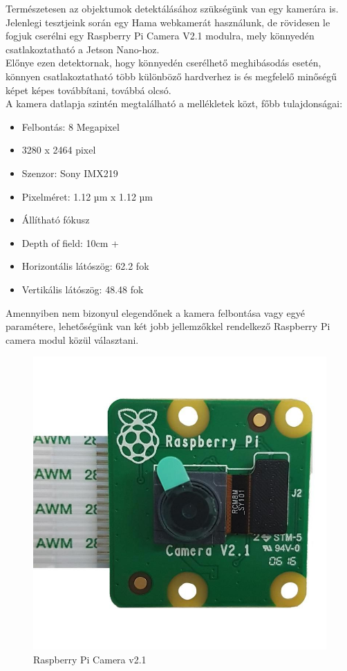 \documentclass{article}
\begin{document}
Természetesen az objektumok detektálásához szükségünk van egy kamerára is.\\
Jelenlegi tesztjeink során egy Hama webkamerát használunk, de rövidesen le fogjuk cserélni
egy Raspberry Pi Camera V2.1 modulra, mely könnyedén csatlakoztatható a Jetson Nano-hoz.\\
Előnye ezen detektornak, hogy könnyedén cserélhető meghibásodás esetén, könnyen csatlakoztatható több
különböző hardverhez is és megfelelő minőségű képet képes továbbítani, továbbá olcsó. \vspace{5pt}\\
A kamera datlapja szintén megtalálható a mellékletek közt, főbb tulajdonságai:
\begin{itemize}
    \item Felbontás: 8 Megapixel
    \item 3280 x 2464 pixel
    \item Szenzor: Sony IMX219
    \item Pixelméret: 1.12 µm x 1.12 µm
    \item Állítható fókusz
    \item Depth of field: 10cm +
    \item Horizontális látószög: 62.2 fok
    \item Vertikális látószög: 48.48 fok
\end{itemize}
Amennyiben nem bizonyul elegendőnek a kamera felbontása vagy egyé paramétere, lehetőségünk van 
két jobb jellemzőkkel rendelkező Raspberry Pi camera modul közül választani.
\begin{figure}
    \centering
    \includegraphics[scale = 0.3]{picam.jpg}
    \caption{Raspberry Pi Camera v2.1}
\end{figure}
\end{document}
